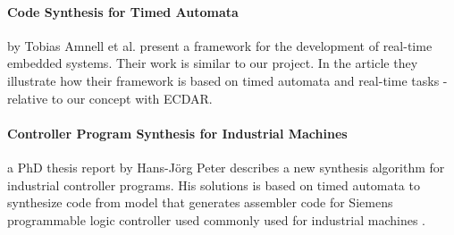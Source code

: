 \paragraph{Code Synthesis for Timed Automata}
by Tobias Amnell et al. present a framework for the development of real-time
embedded systems\cite{Amnell:2002:CST:779110.779112}. Their work is similar to
our project. In the article they illustrate how their framework is based on timed
automata and real-time tasks - relative to our concept with ECDAR.

\paragraph{Controller Program Synthesis for Industrial Machines} a PhD thesis report by Hans-Jörg Peter describes a new synthesis algorithm for industrial controller programs. His solutions is based on timed automata to synthesize code from model that generates assembler code for Siemens programmable logic controller used commonly used for industrial machines \cite{controller-program-synthesis:2005}.
